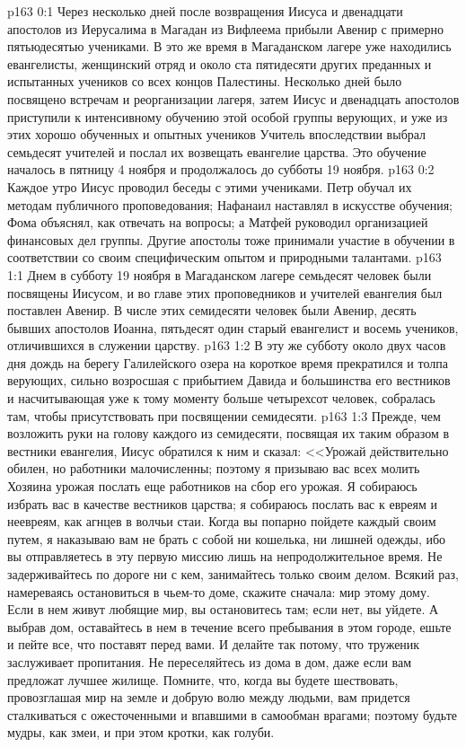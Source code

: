 \vs p163 0:1 Через несколько дней после возвращения Иисуса и двенадцати апостолов из Иерусалима в Магадан из Вифлеема прибыли Авенир с примерно пятьюдесятью учениками. В это же время в Магаданском лагере уже находились евангелисты, женщинский отряд и около ста пятидесяти других преданных и испытанных учеников со всех концов Палестины. Несколько дней было посвящено встречам и реорганизации лагеря, затем Иисус и двенадцать апостолов приступили к интенсивному обучению этой особой группы верующих, и уже из этих хорошо обученных и опытных учеников Учитель впоследствии выбрал семьдесят учителей и послал их возвещать евангелие царства. Это обучение началось в пятницу 4 ноября и продолжалось до субботы 19 ноября.
\vs p163 0:2 Каждое утро Иисус проводил беседы с этими учениками. Петр обучал их методам публичного проповедования; Нафанаил наставлял в искусстве обучения; Фома объяснял, как отвечать на вопросы; а Матфей руководил организацией финансовых дел группы. Другие апостолы тоже принимали участие в обучении в соответствии со своим специфическим опытом и природными талантами.
\vs p163 1:1 Днем в субботу 19 ноября в Магаданском лагере семьдесят человек были посвящены Иисусом, и во главе этих проповедников и учителей евангелия был поставлен Авенир. В числе этих семидесяти человек были Авенир, десять бывших апостолов Иоанна, пятьдесят один старый евангелист и восемь учеников, отличившихся в служении царству.
\vs p163 1:2 В эту же субботу около двух часов дня дождь на берегу Галилейского озера на короткое время прекратился и толпа верующих, сильно возросшая с прибытием Давида и большинства его вестников и насчитывающая уже к тому моменту больше четырехсот человек, собралась там, чтобы присутствовать при посвящении семидесяти.
\vs p163 1:3 Прежде, чем возложить руки на голову каждого из семидесяти, посвящая их таким образом в вестники евангелия, Иисус обратился к ним и сказал: <<Урожай действительно обилен, но работники малочисленны; поэтому я призываю вас всех молить Хозяина урожая послать еще работников на сбор его урожая. Я собираюсь избрать вас в качестве вестников царства; я собираюсь послать вас к евреям и неевреям, как агнцев в волчьи стаи. Когда вы попарно пойдете каждый своим путем, я наказываю вам не брать с собой ни кошелька, ни лишней одежды, ибо вы отправляетесь в эту первую миссию лишь на непродолжительное время. Не задерживайтесь по дороге ни с кем, занимайтесь только своим делом. Всякий раз, намереваясь остановиться в чьем\hyp{}то доме, скажите сначала: мир этому дому. Если в нем живут любящие мир, вы остановитесь там; если нет, вы уйдете. А выбрав дом, оставайтесь в нем в течение всего пребывания в этом городе, ешьте и пейте все, что поставят перед вами. И делайте так потому, что труженик заслуживает пропитания. Не переселяйтесь из дома в дом, даже если вам предложат лучшее жилище. Помните, что, когда вы будете шествовать, провозглашая мир на земле и добрую волю между людьми, вам придется сталкиваться с ожесточенными и впавшими в самообман врагами; поэтому будьте мудры, как змеи, и при этом кротки, как голуби.
